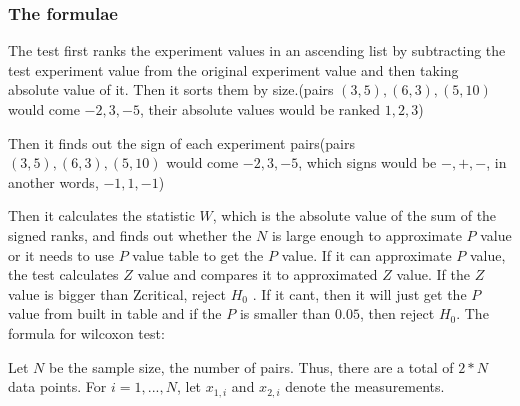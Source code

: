 \documentclass[12pt]{article}
\begin{document}
\subsubsection{The formulae}

The test first ranks the experiment values in an ascending list by subtracting the test experiment value from the original experiment value and then taking absolute value of it. Then it sorts them by size.(pairs $(3, 5), (6, 3), (5, 10)$ would come $-2, 3, -5$, their absolute values would be ranked $1, 2, 3$)

Then it finds out the sign of each experiment pairs(pairs $(3, 5), (6, 3), (5, 10)$ would come $-2, 3, -5$, which signs would be $-, +, -$, in another words, $-1, 1, -1$)

Then it calculates the statistic $W$, which is the absolute value of the sum of the signed ranks, and finds out whether the $N$ is large enough to approximate $P$ value or it needs to use $P$ value table to get the $P$ value. If it can approximate $P$ value, the test calculates $Z$ value and compares it to approximated $Z$ value. If the $Z$ value is bigger than Zcritical, reject $H_0$ . If it cant, then it will just get the $P$ value from built in table and if the $P$ is smaller than $0.05$, then reject $H_0$. The formula for wilcoxon test:

Let $N$ be the sample size, the number of pairs. Thus, there are a total of $2*N$ data points. For $i=1,...,N$, let $x_{1, i}$ and $x_{2, i}$ denote the measurements.
\end{document}
